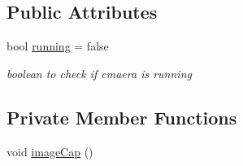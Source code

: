 \subsection*{Public Attributes}
\begin{DoxyCompactItemize}
\item 
bool \hyperlink{class_gesture_detection_1_1_capture_ab022086194534e994259e0f6de25e350}{running} = false
\begin{DoxyCompactList}\small\item\em boolean to check if cmaera is running \end{DoxyCompactList}\end{DoxyCompactItemize}
\subsection*{Private Member Functions}
\begin{DoxyCompactItemize}
\item 
void \hyperlink{class_gesture_detection_1_1_capture_a010b666cb1482b235f8282867e8f1b97}{image\+Cap} ()
\end{DoxyCompactItemize}
